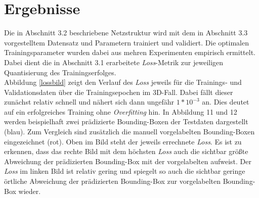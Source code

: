 \section{Ergebnisse}

Die in Abschnitt 3.2 beschriebene Netzstruktur wird mit dem in Abschnitt 3.3 vorgestelltem Datensatz und Parametern trainiert und validiert. Die optimalen Trainingsparameter wurden dabei aus mehren Experimenten empirisch ermittelt. Dabei dient die in Abschnitt 3.1 erarbeitete \textit{Loss}-Metrik zur jeweiligen Quantisierung des Trainingserfolges. \\Abbildung \ref{lossbild} zeigt den Verlauf des \textit{Loss} jeweils für die Trainings- und Validationsdaten über die Trainingsepochen im 3D-Fall. Dabei fällt dieser zunächst relativ schnell und nähert sich dann ungefähr $1*10^{-3}$ an. Dies deutet auf ein erfolgreiches Training ohne \textit{Overfitting} hin. In Abbildung 11 und 12 werden beispielhaft zwei prädizierte Bounding-Boxen der Testdaten dargestellt (blau). Zum Vergleich sind zusätzlich die manuell vorgelabelten Bounding-Boxen eingezeichnet (rot). Oben im Bild steht der jeweils errechnete \textit{Loss}. Es ist zu erkennen, dass das rechte Bild mit dem höchsten \textit{Loss} auch die sichtbar größte Abweichung der prädizierten Bounding-Box mit der vorgelabelten aufweist. Der \textit{Loss} im linken Bild ist relativ gering und spiegelt so auch die sichtbar geringe örtliche Abweichung der prädizierten Bounding-Box zur vorgelabelten Bounding-Box wieder.\\ 
 

